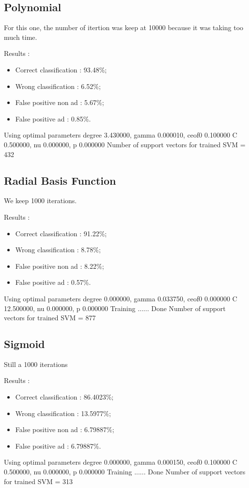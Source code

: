 \subsection{Polynomial}

For this one, the number of itertion was keep at 10000 because it was taking too much time.

Results :
\begin{itemize}
  \item Correct classification : 93.48\%;
  \item Wrong classification : 6.52\%;
  \item False positive non ad : 5.67\%;
  \item False positive ad : 0.85\%.
\end{itemize}
Using optimal parameters degree 3.430000, gamma 0.000010, ceof0 0.100000
	 C 0.500000, nu 0.000000, p 0.000000
   Number of support vectors for trained SVM = 432


\subsection{Radial Basis Function}

We keep 1000 iterations.

Results :
\begin{itemize}
  \item Correct classification : 91.22\%;
  \item Wrong classification : 8.78\%;
  \item False positive non ad : 8.22\%;
  \item False positive ad : 0.57\%.
\end{itemize}

Using optimal parameters degree 0.000000, gamma 0.033750, ceof0 0.000000
	 C 12.500000, nu 0.000000, p 0.000000
 Training ...... Done
Number of support vectors for trained SVM = 877

\subsection{Sigmoid}

Still a 1000 iterations

Results :
\begin{itemize}
  \item Correct classification : 86.4023\%;
  \item Wrong classification : 13.5977\%;
  \item False positive non ad : 6.79887\%;
  \item False positive ad : 6.79887\%.
\end{itemize}
Using optimal parameters degree 0.000000, gamma 0.000150, ceof0 0.100000
	 C 0.500000, nu 0.000000, p 0.000000
 Training ...... Done
Number of support vectors for trained SVM = 313


